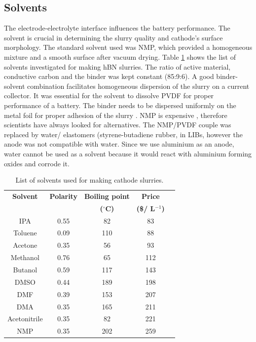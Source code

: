 \subsection*{Solvents}
The electrode-electrolyte interface influences the battery performance. The solvent is crucial in determining the slurry quality and cathode's surface morphology. The standard solvent used was NMP, which provided a homogeneous mixture and a smooth surface after vacuum drying. Table \ref{t1} shows the list of solvents investigated for making hBN slurries. The ratio of active material, conductive carbon and the binder was kept constant (85:9:6). A good binder-solvent combination facilitates homogeneous dispersion of the slurry on a current collector. It was essential for the solvent to dissolve PVDF for proper performance of a battery. The binder needs to be dispersed uniformly on the metal foil for proper adhesion of the slurry \cite{lee_selection_2017, stein_non-aqueous_2016}. 
NMP is expensive , therefore scientists have always looked for alternatives. The NMP/PVDF couple was replaced by water/ elastomers (styrene-butadiene rubber, \cite{lee_novel_2007, li_effects_2005} in LIBs, however the anode was not compatible with water. Since we use aluminium as an anode, water cannot be used as a solvent because it would react with aluminium forming oxides and corrode it.
\begin{table}
\caption{List of solvents used for making cathode slurries.} \label{t1}
\begin{center}
 \begin{tabular}{|ccccc|} 
 \hline
 \textbf{Solvent} & \textbf{Polarity} & \textbf{Boiling point} & \textbf{Price}\\
 \textbf{} & \textbf{} & \textbf{($^{\circ}$C)} & \textbf{(\$/ L$^{-1}$)}\\
 \hline
 \hline
IPA & 0.55 & 82 & 83 \\
Toluene & 0.09 & 110 & 88 \\
Acetone & 0.35 & 56 & 93 \\
Methanol & 0.76 & 65 & 112 \\ 
Butanol & 0.59 & 117 & 143 \\
DMSO & 0.44 & 189 & 198 \\
DMF & 0.39 & 153 & 207 \\
DMA & 0.35 & 165 & 211 \\
Acetonitrile & 0.35 & 82 & 221 \\
NMP & 0.35 & 202 & 259 \\
 \hline
\end{tabular}
\end{center}
\end{table}
